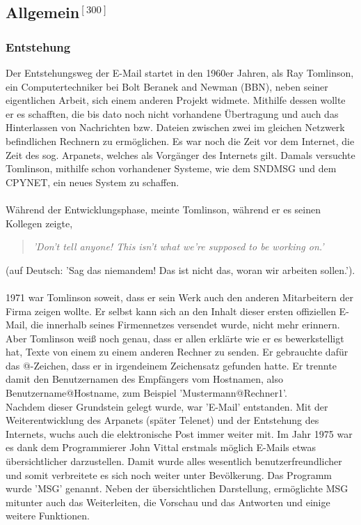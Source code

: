\documentclass[12pt,a4paper]{report}
\begin{document}
\begin{onehalfspace}
\section*{Allgemein$^{[300]}$} %
\subsubsection{Entstehung}\label{sssec:Entstehung}
Der Entstehungsweg der E-Mail startet in den 1960er Jahren, als Ray Tomlinson, ein Computertechniker bei Bolt Beranek and Newman (BBN), neben seiner eigentlichen Arbeit, sich einem anderen Projekt widmete. Mithilfe dessen wollte er es schafften, die bis dato noch nicht vorhandene Übertragung und auch das Hinterlassen von Nachrichten bzw. Dateien zwischen zwei im gleichen Netzwerk befindlichen Rechnern zu ermöglichen. Es war noch die Zeit vor dem Internet, die Zeit des sog. Arpanets, welches als Vorgänger des Internets gilt. Damals versuchte Tomlinson, mithilfe schon vorhandener Systeme, wie dem SNDMSG und dem CPYNET, ein neues System zu schaffen.\\\\

Während der Entwicklungsphase, meinte Tomlinson, während er es seinen Kollegen zeigte, 
\begin{quote}
\textit{'Don't tell anyone! This isn't what we're supposed to be working on.'}
\end{quote}
(auf Deutsch: 'Sag das niemandem! Das ist nicht das, woran wir arbeiten sollen.').\\\\

1971 war Tomlinson soweit, dass er sein Werk auch den anderen Mitarbeitern der Firma zeigen wollte. Er selbst kann sich an den Inhalt dieser ersten offiziellen E-Mail, die innerhalb seines Firmennetzes versendet wurde, nicht mehr erinnern. Aber Tomlinson weiß noch genau, dass er allen erklärte wie er es bewerkstelligt hat, Texte von einem zu einem anderen Rechner zu senden. Er gebrauchte dafür das @-Zeichen, dass er in irgendeinem Zeichensatz gefunden hatte. Er trennte damit den Benutzernamen des Empfängers vom Hostnamen, also Benutzername@Hostname, zum Beispiel 'Mustermann@Rechner1'. \\

Nachdem dieser Grundstein gelegt wurde, war 'E-Mail' entstanden. Mit der Weiterentwicklung des Arpanets (später Telenet) und der Entstehung des Internets, wuchs auch die elektronische Post immer weiter mit. Im Jahr 1975 war es dank dem Programmierer John Vittal erstmals möglich E-Mails etwas übersichtlicher darzustellen. Damit wurde alles wesentlich benutzerfreundlicher und somit verbreitete es sich noch weiter unter Bevölkerung. Das Programm wurde 'MSG' genannt. Neben der übersichtlichen Darstellung, ermöglichte MSG mitunter auch das Weiterleiten, die Vorschau und das Antworten und einige weitere Funktionen.\\


\end{onehalfspace}
\end{document}
